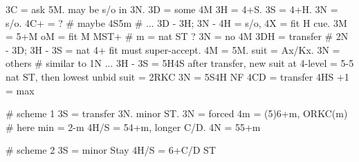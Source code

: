 3C = ask 5M. may be s/o in 3N.
    3D = some 4M
        3H = 4+S. 3S = 4+H. 3N = s/o. 4C+ = ?  # maybe 4S5m
        # ... 3D - 3H; 3N - 4H = s/o, 4X = fit H cue.
    3M = 5+M
        oM = fit M MST+  # m = nat ST ?
    3N = no 4M
3DH = transfer  # 2N - 3D; 3H - 3S = nat
    4+ fit must super-accept. 4M = 5M. suit = Ax/Kx. 3N = others  # similar to 1N
    ... 3H - 3S = 5H4S
    after transfer, new suit at 4-level = 5-5 nat ST, then lowest unbid suit = 2RKC
3N = 5S4H NF
4CD = transfer 4HS
    +1 = max

# scheme 1
3S = transfer 3N. minor ST.
    3N = forced
        4m = (5)6+m, ORKC(m)  # here min = 2-m
        4H/S = 54+m, longer C/D. 4N = 55+m

# scheme 2
3S = minor Stay
4H/S = 6+C/D ST